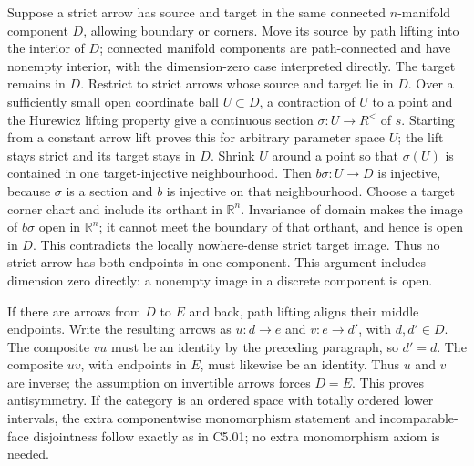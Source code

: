 Suppose a strict arrow has source and target in the same connected \(n\)-manifold component \(D\), allowing boundary or corners. Move its source by path lifting into the interior of \(D\); connected manifold components are path-connected and have nonempty interior, with the dimension-zero case interpreted directly. The target remains in \(D\). Restrict to strict arrows whose source and target lie in \(D\). Over a sufficiently small open coordinate ball \(U\subset D\), a contraction of \(U\) to a point and the Hurewicz lifting property give a continuous section \(\sigma:U\to R^{<}\) of \(s\). Starting from a constant arrow lift proves this for arbitrary parameter space \(U\); the lift stays strict and its target stays in \(D\). Shrink \(U\) around a point so that \(\sigma(U)\) is contained in one target-injective neighbourhood. Then \(b\sigma:U\to D\) is injective, because \(\sigma\) is a section and \(b\) is injective on that neighbourhood. Choose a target corner chart and include its orthant in \(\mathbb R^n\). Invariance of domain makes the image of \(b\sigma\) open in \(\mathbb R^n\); it cannot meet the boundary of that orthant, and hence is open in \(D\). This contradicts the locally nowhere-dense strict target image. Thus no strict arrow has both endpoints in one component. This argument includes dimension zero directly: a nonempty image in a discrete component is open.

If there are arrows from \(D\) to \(E\) and back, path lifting aligns their middle endpoints. Write the resulting arrows as \(u:d\to e\) and \(v:e\to d'\), with \(d,d'\in D\). The composite \(vu\) must be an identity by the preceding paragraph, so \(d'=d\). The composite \(uv\), with endpoints in \(E\), must likewise be an identity. Thus \(u\) and \(v\) are inverse; the assumption on invertible arrows forces \(D=E\). This proves antisymmetry. If the category is an ordered space with totally ordered lower intervals, the extra componentwise monomorphism statement and incomparable-face disjointness follow exactly as in C5.01; no extra monomorphism axiom is needed.

